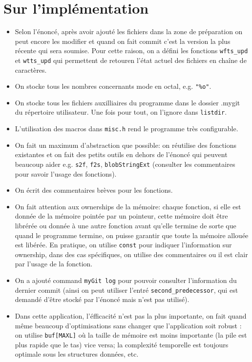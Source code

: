 \documentclass{report}
\begin{document}
\section*{Sur l'implémentation}
\begin{itemize}
  \item Selon l'énoncé, après avoir ajouté les fichiers dans la zone de préparation on peut encore les modifier et quand on
  fait commit c'est la version la plus récente qui sera soumise. Pour cette raison, on a défini les
  fonctions \verb|wfts_upd| et \verb|wtts_upd| qui permettent de retouren l'état actuel des fichiers en chaîne de caractères.
  \item On stocke tous les nombres concernants mode en octal, e.g. \verb|"%o"|.
  \item On stocke tous les fichiers auxilliaires du programme dans le dossier .mygit
  du répertoire utilisateur. Une fois pour tout, on l'ignore dans \verb|listdir|.
  \item L'utilisation des macros dans \verb|misc.h| rend le programme très configurable.
  \item On fait un maximum d'abstraction que possible: on réutilise des fonctions existantes et
  on fait des petits outils en dehors de l'énoncé qui peuvent beaucoup aider e.g. \verb|s2f|, \verb|f2s|, \verb|blobStringExt| (consulter les commentaires pour savoir l'usage des fonctions).
  \item On écrit des commentaires brèves pour les fonctions.
  \item On fait attention aux ownerships de la mémoire: chaque fonction, si elle est donnée de la mémoire pointée
  par un pointeur, cette mémoire doit être librérée ou donnée à une autre fonction avant qu'elle termine de sorte
  que quand le programme termine, on puisse garantir que toute la mémoire allouée est libérée. En pratique, on utilise
  \verb|const| pour indiquer l'information sur ownership, dans des cas spécifiques, on utilise des commentaires ou il est
  clair par l'usage de la fonction.
  \item On a ajouté command \verb|myGit log| pour pouvoir consulter l'information du dernier commit (ainsi on
  peut utiliser l'entré \verb|second_predecessor|, qui est demandé d'être stocké par l'énoncé mais n'est pas utilisé).
  \item Dans cette application, l'éfficacité n'est pas la plus importante, on fait quand même beaucoup d'optimisations sans changer que
  l'application soit robust : on utilise \verb|buf[MAXL]| où la taille de mémoire est moins importante (la pile est plus rapide que le tas) vice versa; 
  la complexité temporelle est toujours optimale sous les structures données, etc.
\end{itemize}
\end{document}
